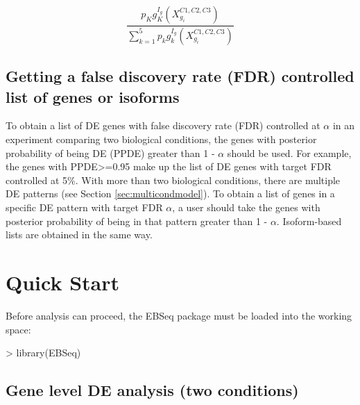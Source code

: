 \documentclass{article}
\begin{document}
\begin{equation}
\frac{p_K g_K^{I_g}(X_{g_i}^{C1,C2,C3})}{\sum_{k=1}^5 p_k g_k^{I_g}(X_{g_i}^{C1,C2,C3})} \label{eq:12}
\end{equation}

\subsection{Getting a false discovery rate (FDR) controlled list of genes or isoforms}
\label{sec:fdrlist}
To obtain a list of DE genes with false discovery rate (FDR) controlled
at $\alpha$ in an experiment comparing two biological conditions, the genes
with posterior probability of being DE (PPDE) greater than 1 - $\alpha$ should be used.
For example, the genes with PPDE>=0.95 make up the list of DE genes with target
FDR controlled at 5\%.  With more than two biological conditions, there are multiple
DE patterns (see Section \ref{sec:multicondmodel}). To obtain a list of genes in a specific DE pattern with target
FDR $\alpha$, a user should
take the genes with posterior probability of being in that pattern greater
than 1 - $\alpha$. Isoform-based lists are obtained in the same way.
\newpage
\section{Quick Start}
\label{sec:quickstart}
Before analysis can proceed, the EBSeq package must be loaded into the working space:
\begin{Schunk}
\begin{Sinput}
> library(EBSeq)
\end{Sinput}
\end{Schunk}
\subsection{Gene level DE analysis (two conditions)}
\label{sec:startgenede}
\end{document}
